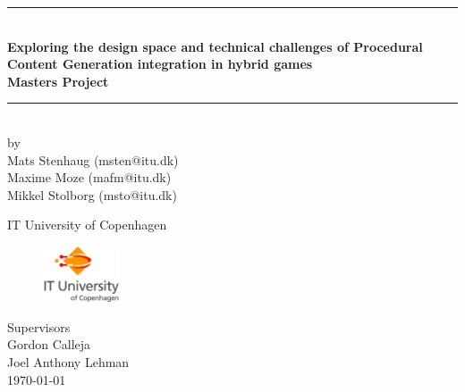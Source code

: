 \documentclass[a4paper,11pt]{report}
\begin{document}
\lstset{language=C}
 
\begin{titlepage}

\centering \parindent=0pt
\newcommand{\HRule}{\rule{\textwidth}{1mm}}
 \HRule\\[1cm]\large\bfseries
Exploring the design space and technical challenges of Procedural Content Generation integration in hybrid games\\[0.7cm]
\large Masters Project\\[1cm]
\HRule\\[1cm]

\large by 
\\Mats Stenhaug (msten@itu.dk)
\\Maxime Moze (mafm@itu.dk)
\\Mikkel Stolborg (msto@itu.dk)
 \normalsize
\begin{flushleft}
IT University of Copenhagen \\
\begin{figure}[!ht]
\includegraphics[width=0.2\textwidth]{Images/ITU_logo_ENG.jpg}
\label{fig:ituLogo}
\end{figure}
Supervisors\\
Gordon Calleja\\
Joel Anthony Lehman\\
\today \end{flushleft}
\end{titlepage}
\end{document}
